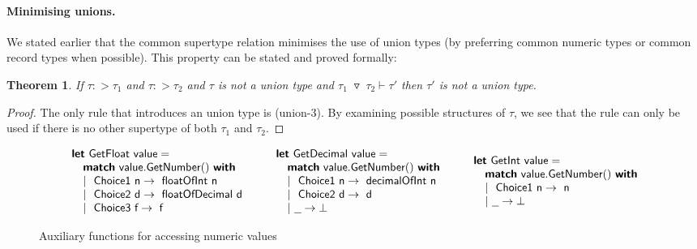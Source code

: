 \documentclass[10pt]{sigplanconf}
\newtheorem{theorem}{Theorem}
\newcommand{\tsep}[0]{\; \triangledown \;}
\newcommand{\kvd}[1]{\textbf{\sffamily #1}}
\newcommand{\ident}[1]{\textnormal{\sffamily #1}}
\begin{document}
\paragraph{Minimising unions.}
We stated earlier that the common supertype relation minimises the use of union types 
(by preferring common numeric types or common record types when possible). This property
can be stated and proved formally:
%
\begin{theorem}
If $\tau :> \tau_1$ and $\tau :> \tau_2$ and $\tau$ is not a union type and
$\tau_1 \tsep \tau_2 \vdash \tau'$ then $\tau'$ is not a union type.
\end{theorem}
\begin{proof}
The only rule that introduces an union type is (union-3). By examining possible structures
of $\tau$, we see that the rule can only be used if there is no other supertype of 
both $\tau_1$ and $\tau_2$.
\end{proof}


\begin{figure}[t]
\begin{equation*}
\begin{array}{l}
\kvd{let}~\ident{GetFloat value} =\\
\quad\kvd{match}~\ident{value.GetNumber}()~\kvd{with}\\
\quad|~\ident{Choice1 n} \rightarrow \ident{floatOfInt n}\\
\quad|~\ident{Choice2 d} \rightarrow \ident{floatOfDecimal d}\\
\quad|~\ident{Choice3 f} \rightarrow \ident{f}\\
\end{array}
\quad\quad
\begin{array}{l}
\kvd{let}~\ident{GetDecimal value} =\\
\quad\kvd{match}~\ident{value.GetNumber}()~\kvd{with}\\
\quad|~\ident{Choice1 n} \rightarrow \ident{decimalOfInt n}\\
\quad|~\ident{Choice2 d} \rightarrow \ident{d}\\
\quad|~\underline{~\;} \rightarrow \bot\\
\end{array}
\quad\quad
\begin{array}{l}
\kvd{let}~\ident{GetInt value} =\\
\quad\kvd{match}~\ident{value.GetNumber}()~\kvd{with}\\
\quad|~\ident{Choice1 n} \rightarrow \ident{n}\\
\quad|~\underline{~\;} \rightarrow \bot
\end{array}
\end{equation*}

\caption{Auxiliary functions for accessing numeric values}
\label{fig:runtime-functions}
\end{figure}
\end{document}
